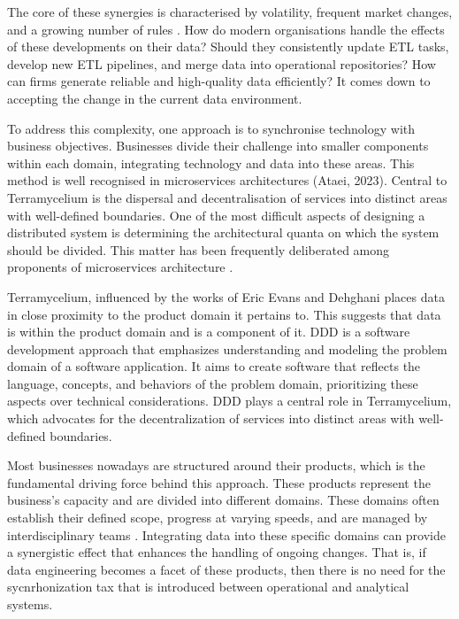 \documentclass[preprint,12pt]{elsarticle}
\begin{document}
The core of these synergies is characterised by volatility, frequent market changes, and a growing number of rules \cite{popovivc2018impact}. How do modern organisations handle the effects of these developments on their data? Should they consistently update ETL tasks, develop new ETL pipelines, and merge data into operational repositories? How can firms generate reliable and high-quality data efficiently? It comes down to accepting the change in the current data environment. 

To address this complexity, one approach is to synchronise technology with business objectives. Businesses divide their challenge into smaller components within each domain, integrating technology and data into these areas. This method is well recognised in microservices architectures (Ataei, 2023). Central to Terramycelium is the dispersal and decentralisation of services into distinct areas with well-defined boundaries. One of the most difficult aspects of designing a distributed system is determining the architectural quanta on which the system should be divided. This matter has been frequently deliberated among proponents of microservices architecture \cite{merson2020modeling}.

Terramycelium, influenced by the works of Eric Evans \cite{evans2004domain} and Dehghani \cite{DataMesh} places data in close proximity to the product domain it pertains to. This suggests that data is within the product domain and is a component of it. DDD is a software development approach that emphasizes understanding and modeling the problem domain of a software application. It aims to create software that reflects the language, concepts, and behaviors of the problem domain, prioritizing these aspects over technical considerations. DDD plays a central role in Terramycelium, which advocates for the decentralization of services into distinct areas with well-defined boundaries.


Most businesses nowadays are structured around their products, which is the fundamental driving force behind this approach. These products represent the business's capacity and are divided into different domains. These domains often establish their defined scope, progress at varying speeds, and are managed by interdisciplinary teams \cite{teamtopologiesSkelton}. Integrating data into these specific domains can provide a synergistic effect that enhances the handling of ongoing changes. That is, if data engineering becomes a facet of these products, then there is no need for the sycnrhonization tax that is introduced between operational and analytical systems.
\end{document}
